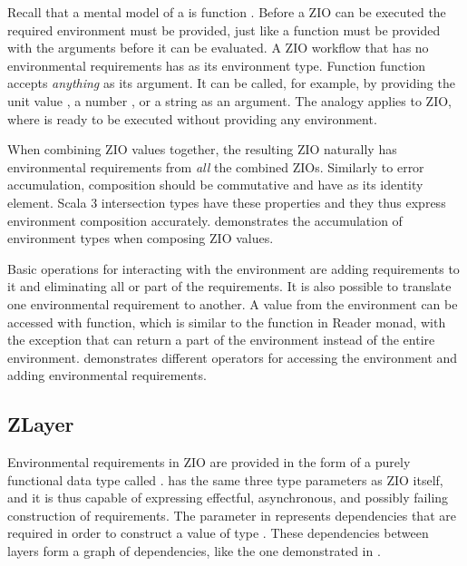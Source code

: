 Recall that a mental model of a  is function . Before a ZIO can be executed the required environment must be provided, just like a function must be provided with the arguments before it can be evaluated. A ZIO workflow that has no environmental requirements has  as its environment type. Function  function accepts \textit{anything} as its argument. It can be called, for example, by providing the unit value , a number , or a string  as an argument. The analogy applies to ZIO, where  is ready to be executed without providing any environment.



When combining ZIO values together, the resulting ZIO naturally has environmental requirements from \emph{all} the combined ZIOs. Similarly to error accumulation, composition should be commutative and have  as its identity element. Scala 3 intersection types have these properties and they thus express environment composition accurately.  demonstrates the accumulation of environment types when composing ZIO values.

Basic operations for interacting with the environment are adding requirements to it and eliminating all or part of the requirements. It is also possible to translate one environmental requirement to another. A value from the environment can be accessed with  function, which is similar to the  function in Reader monad, with the exception that  can return a part of the environment instead of the entire environment.  demonstrates different operators for accessing the environment and adding environmental requirements.




\subsection{ZLayer} \label{zio:environment:zlayer}
Environmental requirements in ZIO are provided in the form of a purely functional data type called .  has the same three type parameters as ZIO itself, and it is thus capable of expressing effectful, asynchronous, and possibly failing construction of requirements. The  parameter in  represents dependencies that are required in order to construct a value of type . These dependencies between layers form a graph of dependencies, like the one demonstrated in .

